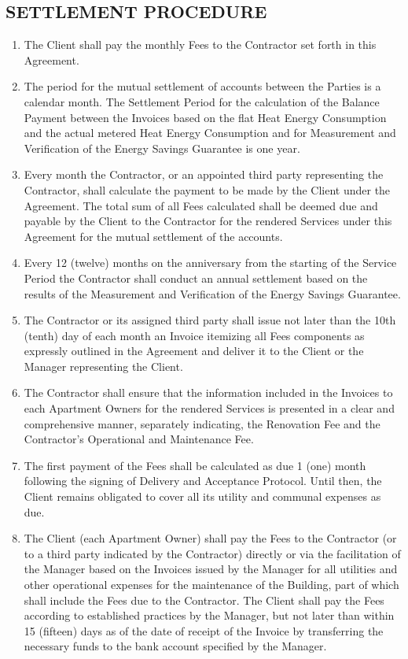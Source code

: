\begin{multicols}{2}
\subsection{SETTLEMENT PROCEDURE}
\begin{enumerate}
	\item	The Client shall pay the monthly Fees to the Contractor set forth in this Agreement.
	\item	The period for the mutual settlement of accounts between the Parties is a calendar month. The Settlement Period for the calculation of the Balance Payment between the Invoices based on the flat Heat Energy Consumption and the actual metered Heat Energy Consumption and for Measurement and Verification of the Energy Savings Guarantee is one year.
	\item	Every month the Contractor, or an appointed third party representing the Contractor, shall calculate the payment to be made by the Client under the Agreement. The total sum of all Fees calculated shall be deemed due and payable by the Client to the Contractor for the rendered Services under this Agreement for the mutual settlement of the accounts.
	\item	Every 12 (twelve) months on the anniversary from the starting of the Service Period the Contractor shall conduct an annual settlement based on the results of the Measurement and Verification of the Energy Savings Guarantee.
	\item	The Contractor or its assigned third party shall issue not later than the 10th (tenth) day of each month an Invoice itemizing all Fees components as expressly outlined in the Agreement and deliver it to the Client or the Manager representing the Client.
	\item	The Contractor shall ensure that the information included in the Invoices to each Apartment Owners for the rendered Services is presented in a clear and comprehensive manner, separately indicating, the Renovation Fee and the Contractor’s Operational and Maintenance Fee.
	\item	The first payment of the Fees shall be calculated as due 1 (one) month following the signing of Delivery and Acceptance Protocol. Until then, the Client remains obligated to cover all its utility and communal expenses as due.
	\item	The Client (each Apartment Owner) shall pay the Fees to the Contractor (or to a third party indicated by the Contractor) directly or via the facilitation of the Manager based on the Invoices issued by the Manager for all utilities and other operational expenses for the maintenance of the Building, part of which shall include the Fees due to the Contractor. The Client shall pay the Fees according to established practices by the Manager, but not later than within 15 (fifteen) days as of the date of receipt of the Invoice by transferring the necessary funds to the bank account specified by the Manager.

\end{enumerate}
\end{multicols}
